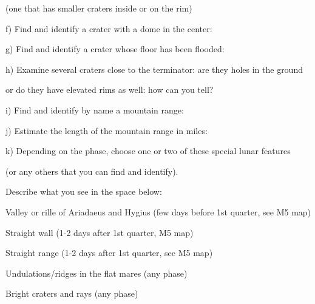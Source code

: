 (one that has smaller craters inside or on the rim)

\medskip
f) Find and identify a crater with a dome in the center: \hfill \makebox[4cm]{\hrulefill}

\medskip
g) Find and identify a crater whose floor has been flooded:
\hfill \makebox[4cm]{\hrulefill}


\medskip
h) Examine several craters close to the terminator: are they holes in
the ground 

or do they have elevated rims as well: how can you tell? 
\hfill \makebox[4cm]{\hrulefill}

\medskip
i) Find and identify by name a mountain range: \hfill
\makebox[4cm]{\hrulefill}


\medskip
j) Estimate the length of the mountain range in miles: \hfill
\makebox[4cm]{\hrulefill}


\clearpage
\medskip
k) Depending on the phase, choose one or two of these special lunar
features 

(or any others that you can find and identify).

Describe what you see in the space below: 

\smallskip
Valley or rille of Ariadaeus and Hygius (few days before 1st quarter, see M5
map) 

\smallskip
Straight wall (1-2 days after 1st quarter, M5 map)

\smallskip
Straight range (1-2 days after 1st quarter, see M5 map)

\smallskip
Undulations/ridges in the flat mares (any phase)

\smallskip
Bright craters and rays (any phase)

\bigskip 
       


